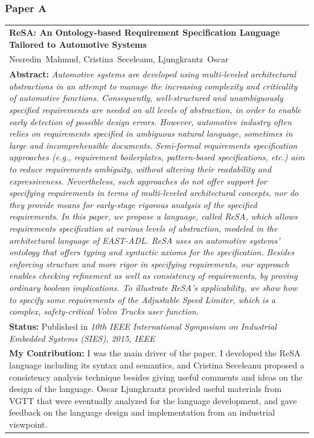 \subsubsection{Paper A}
\begin{tabular}{p{\textwidth}}
\textbf{ReSA: An Ontology-based Requirement Specification Language Tailored to Automotive Systems} \\
Nesredin~Mahmud, Cristina~Seceleanu, Ljungkrantz~Oscar\\[6pt]
\textbf{Abstract:} \textit{Automotive systems are developed using multi-leveled architectural abstractions in an attempt to manage the increasing complexity and criticality of automotive functions. Consequently, well-structured and unambiguously specified requirements are needed on all levels of abstraction, in order to enable early detection of possible design errors. However, automotive industry often relies on requirements specified in ambiguous natural language, sometimes in large and incomprehensible documents. Semi-formal requirements specification approaches (e.g., requirement boilerplates, pattern-based specifications, etc.) aim to reduce requirements ambiguity, without altering their readability and expressiveness. Nevertheless, such approaches do not offer support for specifying requirements in terms of multi-leveled architectural concepts, nor do they provide means for early-stage rigorous analysis of the specified requirements. In this paper, we propose a language, called ReSA, which allows requirements specification at various levels of abstraction, modeled in the architectural language of EAST-ADL. ReSA uses an automotive systems' ontology that offers typing and syntactic axioms for the specification. Besides enforcing structure and more rigor in specifying requirements, our approach enables checking refinement as well as consistency of requirements, by proving ordinary boolean implications. To illustrate ReSA's applicability, we show how to specify some requirements of the Adjustable Speed Limiter, which is a complex, safety-critical Volvo Trucks user function.}\\[6pt]
\textbf{Status:} Published in \textit{10th IEEE International Symposium on Industrial Embedded Systems (SIES), 2015, IEEE}\\
\textbf{My Contribution: }I was the main driver of the paper. I developed the ReSA language including its syntax and semantics, and Cristina Seceleanu proposed a consistency analysis technique besides giving useful comments and ideas on the design of the language. Oscar Ljungkrantz provided useful materials from VGTT that were eventually analyzed for the language development, and gave feedback on the language design and implementation from an industrial viewpoint.
\end{tabular}

